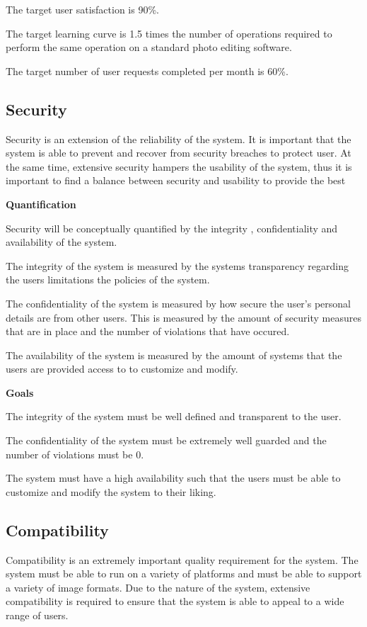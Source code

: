 \documentclass[11pt,a4paper]{article}
\begin{document}
The target user satisfaction is 90\%.

The target learning curve is 1.5 times the number of operations required to perform the same operation on a standard photo editing software. 

The target number of user requests completed per month is 60\%.

\subsection*{Security} 

Security is an extension of the reliability of the system. It is important that the system is able to prevent and recover from security breaches to protect user.
At the same time, extensive security hampers the usability of the system, thus it is important to find a balance between security and usability to provide the best 

{\bf Quantification} 

Security will be conceptually quantified by the integrity , confidentiality and availability of the system.

The integrity of the system is measured by the systems transparency regarding the users limitations the policies of the system.

The confidentiality of the system is measured by how secure the user's personal details are from other users. This is measured by the amount of security measures that are in place and the number of violations that have occured.

The availability of the system is measured by the amount of systems that the users are provided access to to customize and modify.

{\bf Goals}

The integrity of the system must be well defined and transparent to the user.

The confidentiality of the system must be extremely well guarded and the number of violations must be 0.

The system must have a high availability such that the users must be able to customize and modify the system to their liking.

\subsection*{Compatibility} 

Compatibility is an extremely important quality requirement for the system. The system must be able to run on a variety of platforms and 
must be able to support a variety of image formats. Due to the nature of the system, extensive compatibility is required to ensure that the system is able to
appeal to a wide range of users.
\end{document}
